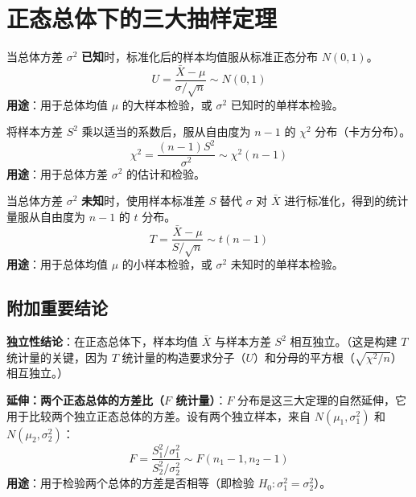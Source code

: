 \section{正态总体下的三大抽样定理}
\begin{theorem}
当总体方差 $\sigma^2$ \textbf{已知}时，标准化后的样本均值服从标准正态分布 $N(0, 1)$。
\begin{equation}
	U = \frac{\bar{X} - \mu}{\sigma/\sqrt{n}} \sim N(0, 1)
	\label{eq:抽样定理:U}
\end{equation}
\textbf{用途}：用于总体均值 $\mu$ 的大样本检验，或 $\sigma^2$ 已知时的单样本检验。
\end{theorem}

\begin{theorem}
将样本方差 $S^2$ 乘以适当的系数后，服从自由度为 $n-1$ 的 $\chi^2$ 分布（卡方分布）。
\begin{equation}
	\chi^2 = \frac{(n-1)S^2}{\sigma^2} \sim \chi^2(n-1)
	\label{eq:抽样定理:卡方}
\end{equation}
\textbf{用途}：用于总体方差 $\sigma^2$ 的估计和检验。
\end{theorem}

\begin{theorem}
当总体方差 $\sigma^2$ \textbf{未知}时，使用样本标准差 $S$ 替代 $\sigma$ 对 $\bar{X}$ 进行标准化，得到的统计量服从自由度为 $n-1$ 的 $t$ 分布。
\begin{equation}
	T = \frac{\bar{X} - \mu}{S/\sqrt{n}} \sim t(n-1)
	\label{eq:抽样定理:T}
\end{equation}
\textbf{用途}：用于总体均值 $\mu$ 的小样本检验，或 $\sigma^2$ 未知时的单样本检验。
\end{theorem}

\subsection{附加重要结论}
\begin{keybox}[正态总体下的附加重要结论]
\textbf{独立性结论}：在正态总体下，样本均值 $\bar{X}$ 与样本方差 $S^2$ 相互独立。（这是构建 $T$ 统计量的关键，因为 $T$ 统计量的构造要求分子（$U$）和分母的平方根（$\sqrt{\chi^2/n}$）相互独立。）

\textbf{延伸：两个正态总体的方差比（$F$ 统计量）}：$F$ 分布是这三大定理的自然延伸，它用于比较两个独立正态总体的方差。设有两个独立样本，来自 $N(\mu_1, \sigma_1^2)$ 和 $N(\mu_2, \sigma_2^2)$：
\begin{equation}
	F = \frac{S_1^2 / \sigma_1^2}{S_2^2 / \sigma_2^2} \sim F(n_1-1, n_2-1)
	\label{eq:抽样定理:F}
\end{equation}
\textbf{用途}：用于检验两个总体的方差是否相等（即检验 $H_0: \sigma_1^2 = \sigma_2^2$）。
\end{keybox}
